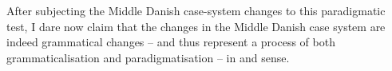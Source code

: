 \documentclass[output=paper]{langsci/langscibook}
\begin{document}
After subjecting the Middle Danish case-system changes to this paradigmatic test, I dare now claim that the changes in the Middle Danish case system are indeed grammatical changes – and thus represent a process of both grammaticalisation and paradigmatisation – in \citet[xi, 71–72]{Nørgård-Sørensen2011} and  sense.

{\sloppy\printbibliography[heading=subbibliography,notkeyword=this]}
\end{document}
